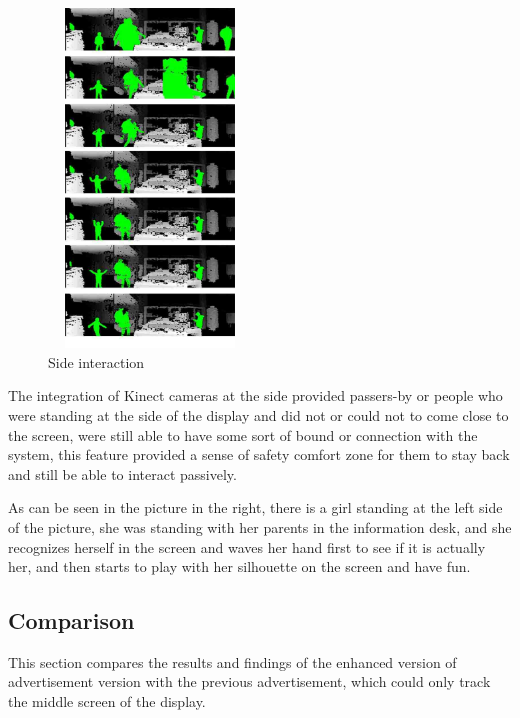 \begin{figure}
  \vspace{-30pt}
  \begin{center}
    \includegraphics[width=0.48\textwidth,height=90mm]{Figures/9/effects/playing}
  \end{center}
  \vspace{-20pt}
  \caption{Side interaction}
  \vspace{-60pt}
\end{figure}
The integration of Kinect cameras at the side provided passers-by or people who were standing at the side of the display and did not or could not to come close to the screen, were still able to have some sort of bound or connection with the system, this feature provided a sense of safety comfort zone for them to stay back and still be able to interact passively. 

As can be seen in the picture in the right, there is a girl standing at the left side of the picture, she was standing with her parents in the information desk, and she recognizes herself in the screen and waves her hand first to see if it is actually her, and then starts to play with her silhouette on the screen and have fun.
\break
\break
\break
\break

\subsection{Comparison}
This section compares the results and findings of the enhanced version of advertisement version with the previous advertisement, which could only track the middle screen of the display. 

